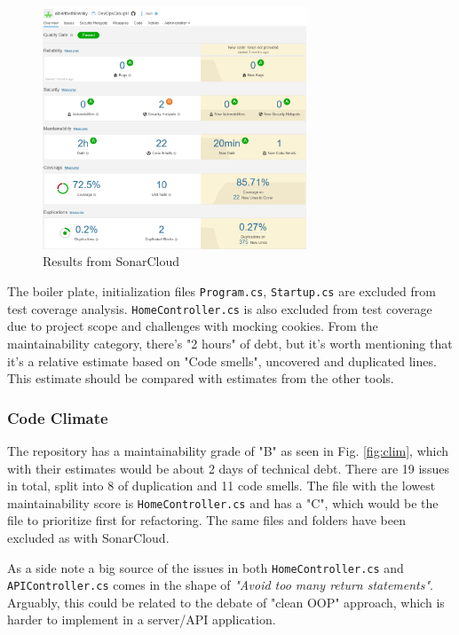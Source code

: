 \documentclass{article}
\begin{document}
\begin{figure}[H]
\centering
\includegraphics[width=0.7\textwidth]{images/sonarcloud.png}
\caption{\label{fig:sonar} Results from SonarCloud}
\end{figure}

The boiler plate, initialization files \texttt{Program.cs}, \texttt{Startup.cs} are excluded from test coverage analysis. \texttt{HomeController.cs} is also excluded from test coverage due to project scope and challenges with mocking cookies.
From the maintainability category, there's "2 hours" of debt, but it's worth mentioning that it's a relative estimate based on "Code smells", uncovered and duplicated lines. This estimate should be compared with estimates from the other tools.   
\subsubsection*{Code Climate}
The repository has a maintainability grade of "B" as seen in Fig. \ref{fig:clim}, which with their estimates would be about 2 days of technical debt. There are 19 issues in total, split into 8 of duplication and 11 code smells. The file with the lowest maintainability score is \texttt{HomeController.cs} and has a "C", which would be the file to prioritize first for refactoring. The same files and folders have been excluded as with SonarCloud. %

As a side note a big source of the issues in both \texttt{HomeController.cs} and \texttt{APIController.cs} comes in the shape of \textit{"Avoid too many return statements"}. Arguably, this could be related to the debate of "clean OOP" approach, which is harder to implement in a server/API application. %
\end{document}
